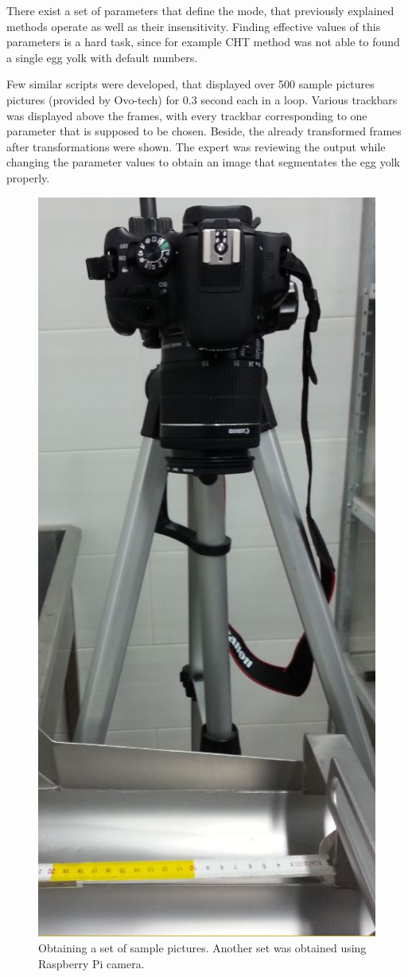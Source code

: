 \documentclass[12pt,twoside,a4paper]{article}
\begin{document}
There exist a set of parameters that define the mode, that previously explained methods operate as well as their insensitivity.
Finding effective values of this parameters is a hard task, since for example CHT method was not able to found a single egg yolk with default numbers.


Few similar scripts were developed, that displayed over 500 sample pictures pictures (provided by Ovo-tech) for 0.3 second each in a loop.
Various trackbars was displayed above the frames, with every trackbar corresponding to one parameter that is supposed to be chosen.
Beside, the already transformed frames after transformations were shown.
The expert was reviewing the output while changing the parameter values to obtain an image that segmentates the egg yolk properly.

\begin{figure}[H]
\centering
\includegraphics[width=0.2\paperwidth]{samples}
\caption{Obtaining a set of sample pictures. Another set was obtained using Raspberry Pi camera.}
\end{figure}
\end{document}
